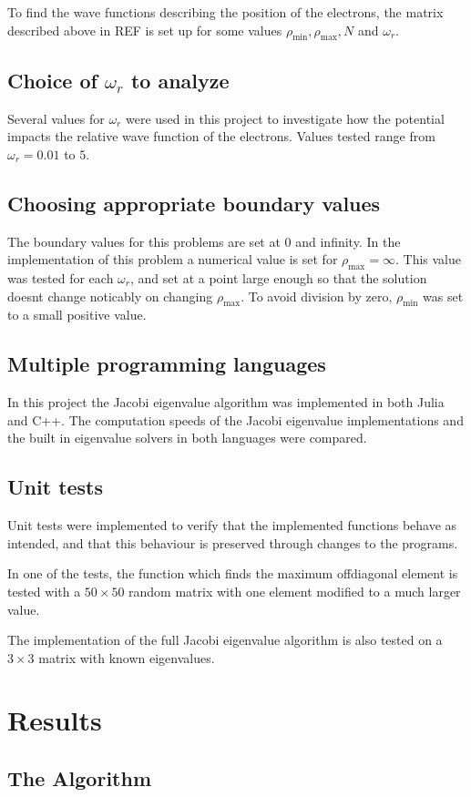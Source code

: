 \documentclass[aps,reprint]{revtex4-1}
\begin{document}
To find the wave functions describing the position of the electrons, the matrix
described above in REF is set up for some values \(\rho_{\text{min}},
\rho_{\text{max}}, N\) and \(\omega_{r}\).
\subsection{Choice of $\omega_r$ to analyze}
Several values for $\omega_r$ were used in this project to investigate how the
potential impacts the relative wave function of the electrons. Values tested range
from $\omega_r = 0.01$ to $5$.
\subsection{Choosing appropriate boundary values}
The boundary values for this problems are set at $0$ and infinity. In the
implementation of this problem a numerical value is set for $\rho_\text{max} = \infty$.
This value was tested for each $\omega_r$, and set at a point large enough
so that the solution doesnt change noticably on changing $\rho_\text{max}$.
To avoid division by zero, $\rho_\text{min}$ was set to a small positive value.
\subsection{Multiple programming languages}
In this project the Jacobi eigenvalue algorithm was implemented in both Julia and
C++. The computation speeds of the Jacobi eigenvalue implementations
and the built in eigenvalue solvers in both languages were compared.
\subsection{Unit tests}
Unit tests were implemented to verify that the implemented functions behave
as intended, and that this behaviour is preserved through changes to the programs.

In one of the tests, the function which finds the maximum offdiagonal element
is tested with a $50 \times 50$ random matrix with one element modified to a
much larger value.

The implementation of the full Jacobi eigenvalue algorithm is also tested on a
$3 \times 3$ matrix with known eigenvalues.
\section{Results}
\label{sec:results}

\subsection{The Algorithm}
\label{sec:algorithm}
\end{document}

